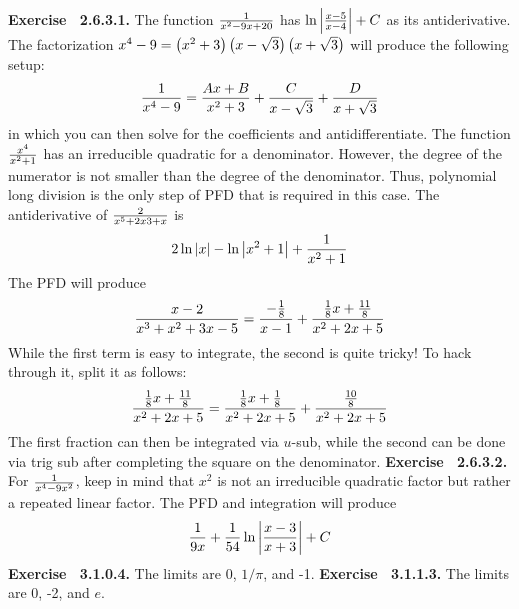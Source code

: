  {\noindent \protect \bf  Exercise ~2.6.3.1.} \textbullet The function $\protect \frac  {1}{x^2-9x+20}$ has $\protect \qopname  \relax o{ln}\left |\protect \frac  {x-5}{x-4}\right |+C$ as its antiderivative. \textbullet The factorization $x^4-9=\left (x^2+3\right )\left (x-\protect \sqrt  {3}\right )\left (x+\protect \sqrt  {3}\right )$ will produce the following setup: $$\protect \frac  {1}{x^4-9}=\protect \frac  {Ax+B}{x^2+3}+\protect \frac  {C}{x-\protect \sqrt  {3}}+\protect \frac  {D}{x+\protect \sqrt  {3}} $$ in which you can then solve for the coefficients and antidifferentiate. \textbullet The function $\protect \frac  {x^4}{x^2+1}$ has an irreducible quadratic for a denominator. However, the degree of the numerator is not smaller than the degree of the denominator. Thus, polynomial long division is the only step of PFD that is required in this case. \textbullet The antiderivative of $\protect \frac  {2}{x^5+2x3+x}$ is $$2\protect \qopname  \relax o{ln}|x|-\protect \qopname  \relax o{ln}\left | x^2+1\right |+\protect \frac  {1}{x^2+1}$$ \textbullet The PFD will produce $$ \protect \frac  {x-2}{x^3+x^2+3x-5}=\protect \frac  {-\protect \frac  {1}{8}}{x-1}+\protect \frac  {\protect \frac  {1}{8}x+\protect \frac  {11}{8}}{x^2+2x+5}$$ While the first term is easy to integrate, the second is quite tricky! To hack through it, split it as follows: $$\protect \frac  {\protect \frac  {1}{8}x+\protect \frac  {11}{8}}{x^2+2x+5}=\protect \frac  {\protect \frac  {1}{8}x+\protect \frac  {1}{8}}{x^2+2x+5}+\protect \frac  {\protect \frac  {10}{8}}{x^2+2x+5} $$ The first fraction can then be integrated via $u$-sub, while the second can be done via trig sub after completing the square on the denominator. \protect \newline  \protect \newline  
 {\noindent \protect \bf  Exercise ~2.6.3.2.} For $\protect \frac  {1}{x^4-9x^2}$, keep in mind that $x^2$ is not an irreducible quadratic factor but rather a repeated linear factor. The PFD and integration will produce $$\protect \frac  {1}{9x}+\protect \frac  {1}{54}\protect \qopname  \relax o{ln}\left |\protect \frac  {x-3}{x+3}\right |+C $$  \protect \newline  \protect \newline  
 {\noindent \protect \bf  Exercise ~3.1.0.4.} The limits are 0, $1/\pi $, and -1.  \protect \newline  \protect \newline  
 {\noindent \protect \bf  Exercise ~3.1.1.3.} The limits are 0, -2, and $e$.  \protect \newline  \protect \newline  
